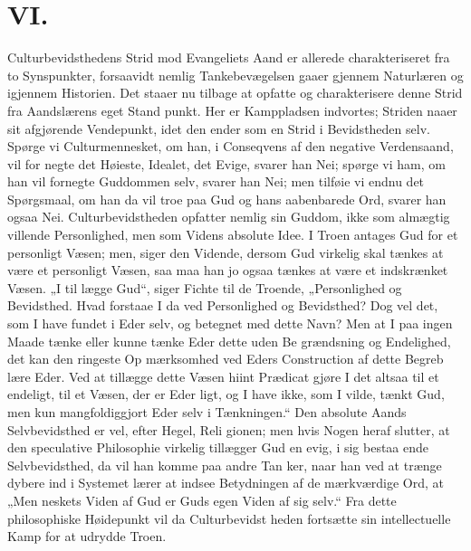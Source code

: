 \documentclass[12pt]{book}
\newcommand{\opage}[1]{\marginnote{\footnotesize\textit{[#1]}}}
\begin{document}
\chapter*{VI.}
\label{ch:vi}
\opage{90}\setcounter{footnote}{0}%
Culturbevidsthedens Strid mod Evangeliets Aand er
allerede charakteriseret fra to Synspunkter, forsaavidt
nemlig Tankebevægelsen gaaer gjennem Naturlæren og
igjennem Historien. Det staaer nu tilbage at opfatte og
charakterisere denne Strid fra Aandslærens eget Stand\-%
punkt. Her er Kamppladsen indvortes; Striden naaer
sit afgjørende Vendepunkt, idet den ender som en Strid
i Bevidstheden selv. Spørge vi Culturmennesket, om
han, i Conseqvens af den negative Verdensaand, vil for\-%
negte det Høieste, Idealet, det Evige, svarer han Nei;
spørge vi ham, om han vil fornegte Guddommen selv,
svarer han Nei; men tilføie vi endnu det Spørgsmaal,
om han da vil troe paa Gud og hans aabenbarede Ord,
svarer han ogsaa Nei. Culturbevidstheden opfatter nemlig
sin Guddom, ikke som almægtig villende Personlighed, men
som Videns absolute Idee. I Troen antages Gud for et
personligt Væsen; men, siger den Vidende, dersom Gud
virkelig skal tænkes at være et personligt Væsen, saa maa
han jo ogsaa tænkes at være et indskrænket Væsen. „I til\-%
lægge Gud“, siger Fichte til de Troende, „Personlighed
og Bevidsthed. Hvad forstaae I da ved Personlighed
og Bevidsthed? Dog vel det, som I have fundet i Eder
selv, og betegnet med dette Navn? Men at I paa ingen
\opage{91}\setcounter{footnote}{0}%
Maade tænke eller kunne tænke Eder dette uden Be\-%
grændsning og Endelighed, det kan den ringeste Op\-%
mærksomhed ved Eders Construction af dette Begreb
lære Eder. Ved at tillægge dette Væsen hiint Prædicat
gjøre I det altsaa til et endeligt, til et Væsen, der er
Eder ligt, og I have ikke, som I vilde, tænkt Gud, men
kun mangfoldiggjort Eder selv i Tænkningen.“ Den
absolute Aands Selvbevidsthed er vel, efter Hegel, Reli\-%
gionen; men hvis Nogen heraf slutter, at den speculative
Philosophie virkelig tillægger Gud en evig, i sig bestaa\-%
ende Selvbevidsthed, da vil han komme paa andre Tan\-%
ker, naar han ved at trænge dybere ind i Systemet lærer
at indsee Betydningen af de mærkværdige Ord, at „Men\-%
neskets Viden af Gud er Guds egen Viden af sig selv.“
Fra dette philosophiske Høidepunkt vil da Culturbevidst\-%
heden fortsætte sin intellectuelle Kamp for at udrydde
Troen.
\end{document}
